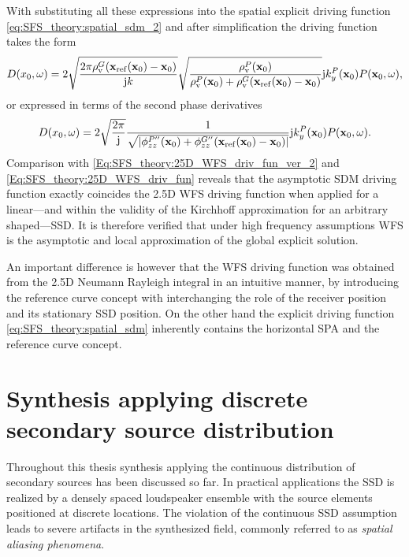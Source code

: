 With substituting all these expressions into the spatial explicit driving function \eqref{eq:SFS_theory:spatial_sdm_2} and after simplification the driving function takes the form
\begin{equation}
D(x_0,\omega) =
2\sqrt{\frac{2\pi  \rho_\mathrm{v}^G(\mathbf{x}_{\mathrm{ref}}(\mathbf{x}_0)-\mathbf{x}_0)}{\mathrm{j} k}} 
\sqrt{\frac{\rho_\mathrm{v}^P(\mathbf{x}_0) }{\rho_\mathrm{v}^P(\mathbf{x}_0) + \rho_\mathrm{v}^G(\mathbf{x}_{\mathrm{ref}}(\mathbf{x}_0)-\mathbf{x}_0)}}
\mathrm{j} k_y^{P}(\mathbf{x}_0)
P(\mathbf{x}_0,\omega),
\end{equation}
or expressed in terms of the second phase derivatives 
\begin{equation}
D(x_0,\omega) =
2\sqrt{\frac{2\pi }{\mathrm{j} }} 
\frac{ 1 }{\sqrt{|\phi^{P''}_{zz}(\mathbf{x}_0) + \phi^{G''}_{zz}(\mathbf{x}_{\mathrm{ref}}(\mathbf{x}_0)-\mathbf{x}_0)|}}
\mathrm{j} k_y^{P}(\mathbf{x}_0)
P(\mathbf{x}_0,\omega).
\end{equation}
Comparison with \eqref{Eq:SFS_theory:25D_WFS_driv_fun_ver_2} and \eqref{Eq:SFS_theory:25D_WFS_driv_fun} reveals that the asymptotic SDM driving function exactly coincides the 2.5D WFS driving function when applied for a linear---and within the validity of the Kirchhoff approximation for an arbitrary shaped---SSD.
It is therefore verified that under high frequency assumptions WFS is the asymptotic and local approximation of the global explicit solution.

An important difference is however that the WFS driving function was obtained from the 2.5D Neumann Rayleigh integral in an intuitive manner, by introducing the reference curve concept with interchanging the role of the receiver position and its stationary SSD position. 
On the other hand the explicit driving function \eqref{eq:SFS_theory:spatial_sdm} inherently contains the horizontal SPA and the reference curve concept.

\section{Synthesis applying discrete secondary source distribution}
\label{Sec:Aliasing}

Throughout this thesis synthesis applying the continuous distribution of secondary sources has been discussed so far.
In practical applications the SSD is realized by a densely spaced loudspeaker ensemble with the source elements positioned at discrete locations.
The violation of the continuous SSD assumption leads to severe artifacts in the synthesized field, commonly referred to as \emph{spatial aliasing phenomena}.

